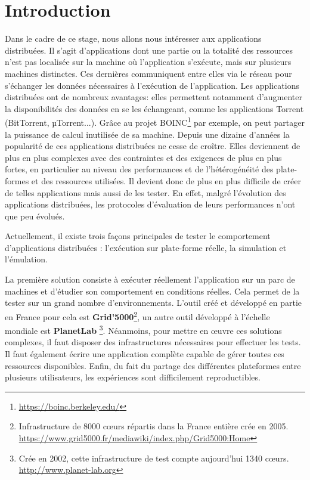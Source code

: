 \section{Introduction}



Dans le cadre de ce stage, nous allons nous intéresser aux applications
distribuées. Il s'agit d'applications dont une partie ou la totalité des
ressources n'est pas localisée sur la machine où l'application s'exécute, mais sur
plusieurs machines distinctes. Ces dernières communiquent entre elles via le
réseau pour s'échanger les données nécessaires à l'exécution de
l'application. Les applications distribuées ont de nombreux avantages: elles
permettent notamment d'augmenter la disponibilités des données en se les
échangeant, comme les applications Torrent (BitTorrent, $µ$Torrent...). Grâce au
projet BOINC\footnote{\url{https://boinc.berkeley.edu/}} par exemple, on peut
partager la puissance de calcul inutilisée de sa machine. Depuis une dizaine
d'années la popularité de ces applications distribuées ne cesse de
croître. Elles deviennent de plus en plus complexes avec des contraintes et des
exigences de plus en plus fortes, en particulier au niveau des performances et
de l'hétérogénéité des plate-formes et des ressources utilisées. Il devient donc
de plus en plus difficile de créer de telles applications mais aussi de les
tester. En effet, malgré l'évolution des applications distribuées, les
protocoles d'évaluation de leurs performances n'ont que peu évolués.
\newline

Actuellement, il existe trois façons principales de tester le comportement
d'applications distribuées \citep{gustedt2009experimental}: l'exécution sur
plate-forme réelle, la simulation et l'émulation.

La première solution consiste à exécuter réellement l'application sur un parc de
machines et d'étudier son comportement en conditions réelles. Cela permet de la
tester sur un grand nombre d'environnements. L'outil créé et développé en partie
en France pour cela est
\textbf{Grid'5000}\footnote{Infrastructure de 8000 c\oe urs répartis dans la
  France entière crée en
  2005. \\ \url{https://www.grid5000.fr/mediawiki/index.php/Grid5000:Home}}\citep{GRID5000},
un autre outil développé à l'échelle mondiale est
\textbf{PlanetLab} \footnote{Crée en 2002, cette infrastructure de test compte
  aujourd'hui 1340 c\oe urs. \\ \url{http://www.planet-lab.org}}. Néanmoins, pour
mettre en \oe uvre ces solutions complexes, il faut disposer des infrastructures
nécessaires pour effectuer les tests. Il faut également écrire une application
complète capable de gérer toutes ces ressources disponibles. Enfin, du fait du
partage des différentes plateformes entre plusieurs utilisateurs, les
expériences sont difficilement reproductibles.

